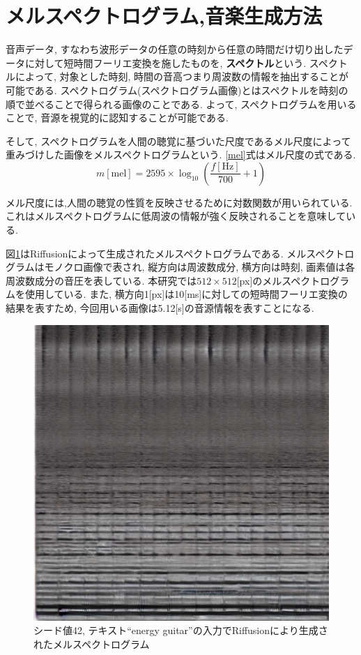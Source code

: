 \documentclass[a4paper,11pt,dvipdfmx]{jreport}
\begin{document}
\section{メルスペクトログラム,音楽生成方法}
音声データ, すなわち波形データの任意の時刻から任意の時間だけ切り出したデータに対して短時間フーリエ変換を施したものを, \textbf{スペクトル}という.
スペクトルによって, 対象とした時刻, 時間の音高つまり周波数の情報を抽出することが可能である.
スペクトログラム(スペクトログラム画像)とはスペクトルを時刻の順で並べることで得られる画像のことである.
よって, スペクトログラムを用いることで, 音源を視覚的に認知することが可能である.

そして, スペクトログラムを人間の聴覚に基づいた尺度であるメル尺度によって重みづけした画像をメルスペクトログラムという.
\ref{mel}式はメル尺度の式である.
\begin{equation}
  m[\mathrm{mel}] = 2595 \times \log_{10}\left( \frac{f[\mathrm{Hz}]}{700}+1\right) \label{mel}
\end{equation}

メル尺度には,人間の聴覚の性質を反映させるために対数関数が用いられている.
これはメルスペクトログラムに低周波の情報が強く反映されることを意味している.

\newpage
図\ref{melsp}はRiffusionによって生成されたメルスペクトログラムである.
メルスペクトログラムはモノクロ画像で表され, 縦方向は周波数成分, 横方向は時刻, 画素値は各周波数成分の音圧を表している.
本研究では$512\times 512$[px]のメルスペクトログラムを使用している.
また, 横方向1[px]は10[ms]に対しての短時間フーリエ変換の結果を表すため, 今回用いる画像は5.12[s]の音源情報を表すことになる.

\begin{figure}[htbp]
  \begin{center}
    \includegraphics[width=0.8\linewidth]{energy_guitar.jpg}
      \caption{シード値42, テキスト``energy guitar''の入力でRiffusionにより生成されたメルスペクトログラム}
    \label{melsp}
  \end{center}
\end{figure}
\end{document}
